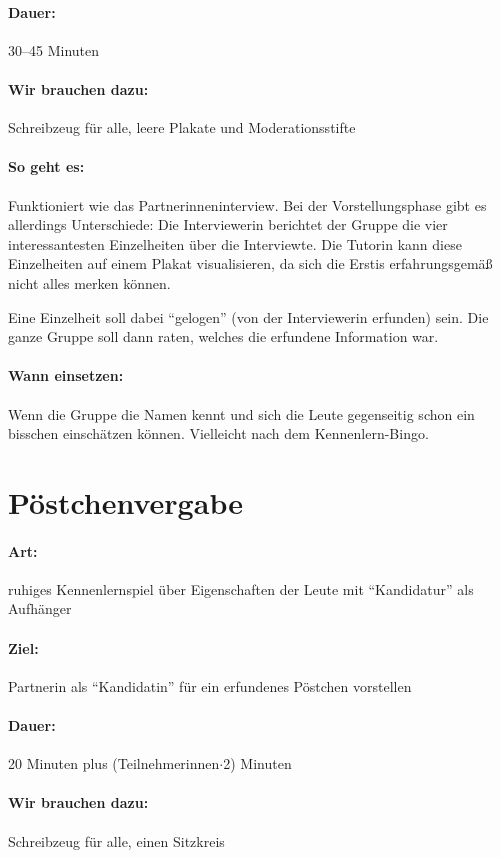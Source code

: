 \paragraph{Dauer:} 30--45 Minuten
\paragraph{Wir brauchen dazu:} Schreibzeug für alle, leere Plakate und Moderationsstifte
\paragraph{So geht es:} Funktioniert wie das Partnerinneninterview. Bei der Vorstellungsphase gibt es allerdings Unterschiede:
Die Interviewerin berichtet der Gruppe die vier interessantesten Einzelheiten über die Interviewte. Die Tutorin kann diese Einzelheiten auf einem Plakat visualisieren, da sich die Erstis erfahrungsgemäß nicht alles merken können.

Eine Einzelheit soll dabei "`gelogen"' (von der Interviewerin erfunden) sein. Die ganze Gruppe soll dann raten, welches die erfundene Information war.
\paragraph{Wann einsetzen:} Wenn die Gruppe die Namen kennt und sich die Leute gegenseitig schon ein bisschen einschätzen können. Vielleicht nach dem Kennenlern-Bingo.

\section{Pöstchenvergabe}
\label{poestchenvergabe}
\paragraph{Art:} ruhiges Kennenlernspiel über Eigenschaften der Leute mit "`Kandidatur"' als Aufhänger
\paragraph{Ziel:} Partnerin als "`Kandidatin"' für ein erfundenes Pöstchen vorstellen
\paragraph{Dauer:} 20 Minuten plus (Teilnehmerinnen$\cdot$2) Minuten
\paragraph{Wir brauchen dazu:} Schreibzeug für alle, einen Sitzkreis
